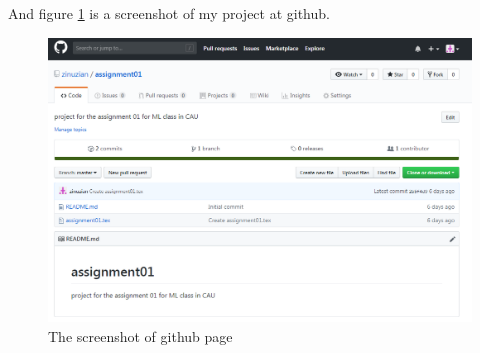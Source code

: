 \documentclass{article}
\begin{document}
And figure \ref{fig:screenshot} is a screenshot of my project at github.
\begin{figure}[h!]
\centering
\includegraphics[scale=0.5]{sc}
\caption{The screenshot of github page}
\label{fig:screenshot}
\end{figure}



\end{document}
